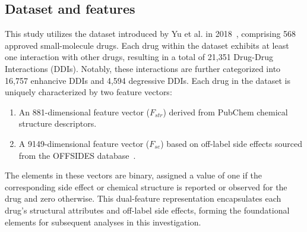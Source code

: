 \documentclass[unnumsec,webpdf,contemporary,large]{oup-authoring-template}%
\theoremstyle{thmstyleone}%
\theoremstyle{thmstyletwo}%
\theoremstyle{thmstylethree}%
\begin{document}
\subsection{Dataset and features}\label{subsec2}
This study utilizes the dataset introduced by Yu et al. in 2018~\cite{Yu2018}, comprising 568 approved small-molecule drugs. Each drug within the dataset exhibits at least one interaction with other drugs, resulting in a total of 21,351 Drug-Drug Interactions (DDIs). Notably, these interactions are further categorized into 16,757 enhancive DDIs and 4,594 degressive DDIs.
Each drug in the dataset is uniquely characterized by two feature vectors:
\begin{enumerate}
 \item An 881-dimensional feature vector ($F_{str}$) derived from PubChem chemical structure descriptors.
 \item A 9149-dimensional feature vector ($F_{se}$) based on off-label side effects sourced from the OFFSIDES database~\cite{Tatonetti2012}.
\end{enumerate} 
The elements in these vectors are binary, assigned a value of one if the corresponding side effect or chemical structure is reported or observed for the drug and zero otherwise. This dual-feature representation encapsulates each drug's structural attributes and off-label side effects, forming the foundational elements for subsequent analyses in this investigation.
\end{document}
